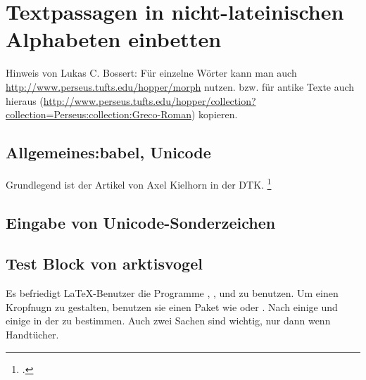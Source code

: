 \chapter{Textpassagen in nicht-lateinischen Alphabeten einbetten}

Hinweis von Lukas C. Bossert:
Für einzelne Wörter kann man auch \url{http://www.perseus.tufts.edu/hopper/morph} nutzen.
bzw. für antike Texte auch hieraus (\url{http://www.perseus.tufts.edu/hopper/collection?collection=Perseus:collection:Greco-Roman}) kopieren.

\section{Allgemeines:\enspace babel, Unicode}

Grundlegend ist der Artikel von Axel Kielhorn in der DTK.%
\footcite{kielhorn:dtk2014}

\section{Eingabe von Unicode-Sonderzeichen}
\label{unicodeeingabe}

\label{unicodeviaemacs}

\section{Test Block von arktisvogel}

\label{cpftestalpha}

Es befriedigt \LaTeX{}-Benutzer die Programme \LuaLaTeX ,
\METAFONT{}, \pdfLaTeX{} und \XeLaTeX{} zu benutzen. Um einen
Kropfnugn zu gestalten, benutzen sie einen Paket wie
 oder .
Nach einige %
%
und einige
%
\space%
in der %
%
\space%
zu bestimmen. Auch zwei %
\space%
Sachen sind %
%
\space%
wichtig, nur dann wenn %
%
\space%
Handtücher.

